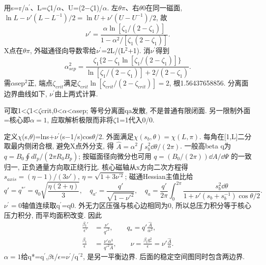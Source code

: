 \begin{solution}
用s=r/a\ensuremath{{}^{\prime}}、L=\ensuremath{\zeta}1/\ensuremath{\alpha}、U=(2\ensuremath{-}\ensuremath{\zeta}1)/\ensuremath{\alpha}. 左\ensuremath{\theta}\ensuremath{\pi}、右\ensuremath{\theta}0在同一磁面, $\ln L-\nu'(L-L^{-1})/2=\ln U+\nu'(U-U^{-1})/2$, 故
\begin{equation}
 \nu'=\frac{\alpha\ln[\zeta_1/(2-\zeta_1)]}{1-\alpha^2/[\zeta_1(2-\zeta_1)]}.
\end{equation}
X点在\ensuremath{\theta}\ensuremath{\pi}, 外磁通径向导数零给\ensuremath{\nu}\ensuremath{{}^{\prime}}=2L/(L\ensuremath{{}^{2}}+1). 消\ensuremath{\nu}\ensuremath{{}^{\prime}}得到
\begin{equation}
 \alpha_{sep}^2=\frac{\zeta_1\{2-\zeta_1\ln[\zeta_1/(2-\zeta_1)]\}}
 {\ln[\zeta_1/(2-\zeta_1)]+2/(2-\zeta_1)}.
\end{equation}
需\ensuremath{\alpha}sep\ensuremath{{}^{2}}正, 端点$\zeta_{crit}$满足$\zeta_{crit}\ln[\zeta_{crit}/(2-\zeta_{crit})]=2$, 根1.56437658856. 分离面边界曲线如下, \ensuremath{\nu}\ensuremath{{}^{\prime}}由上两式计算.

可取1<\ensuremath{\zeta}1<\ensuremath{\zeta}crit,0<\ensuremath{\alpha}<\ensuremath{\alpha}sep; 等号分离面qa发散, 不是普通有限闭面. 另一限制外面=核心即$\alpha=1$, 应取解析极限而非将\ensuremath{\zeta}1=1代入0/0.

定义\ensuremath{\chi}(s,\ensuremath{\theta})=lns+\ensuremath{\nu}\ensuremath{{}^{\prime}}(s\ensuremath{-}1/s)cos\ensuremath{\theta}/2. 外面满足$\chi(s_b,\theta)=\chi(L,\pi)$. 每角在[1,L]二分取最内侧闭合根, 避免X点外分支, 得 $\widehat A=\alpha^2\int s_b^2\dd\theta/(2\pi)$. 一般高beta q为 $q= B_0\oint dl_p/(2\pi R_0B_p)$; 按磁面径向微分也可用 $q=(B_0/(2\pi))\dd A/\dd\Psi$ 的一致归一, 正负通量方向取正绕行比. 核心磁轴从x方向二次方程得 $s_{axis}=(\eta-1)/(3\nu')$, $\eta=\sqrt{1+3\nu^{\prime2}}$; 磁通Hessian主值比给
\begin{equation}
 q'=q^{*\prime}=q_0\sqrt{\frac{\eta(2+\eta)}3},\quad
 q_{a'}=\frac{q'}{\sqrt{1-\nu'^2}},\quad
 q_a=\frac{q'}{2\pi}\int_0^{2\pi}\frac{s_b^2\dd\theta}{1+\nu'(s_b+s_b^{-1})\cos\theta/2}.
\end{equation}
$\nu^{\prime}=0$轴值连续取q\ensuremath{{}^{\prime}}=q0. 外无力区压强与核心边相同为0, 所以总压力积分等于核心压力积分, 而平均面积改变. 因此
\begin{align}
 \frac{\beta_t'}{\epsilon'}&=\frac{\nu'}{q'^2},\qquad
 q_*=q'\frac{\widehat A}{\alpha^2},\\
 \frac{\beta_t}{\epsilon}&=\frac{\nu'\alpha^3}{q'^2\widehat A},\qquad
 \nu=\frac{\beta_tq_*^2}{\epsilon}=\nu'\frac{\widehat A}{\alpha}.
\end{align}
$\alpha=1$给q*=q\ensuremath{{}^{\prime}},\ensuremath{\beta}t/\ensuremath{\epsilon}=\ensuremath{\nu}\ensuremath{{}^{\prime}}/q\ensuremath{{}^{\prime}}\ensuremath{{}^{2}}, 是另一平衡边界. 后面的稳定空间图同时包含两边界.


\end{solution}
